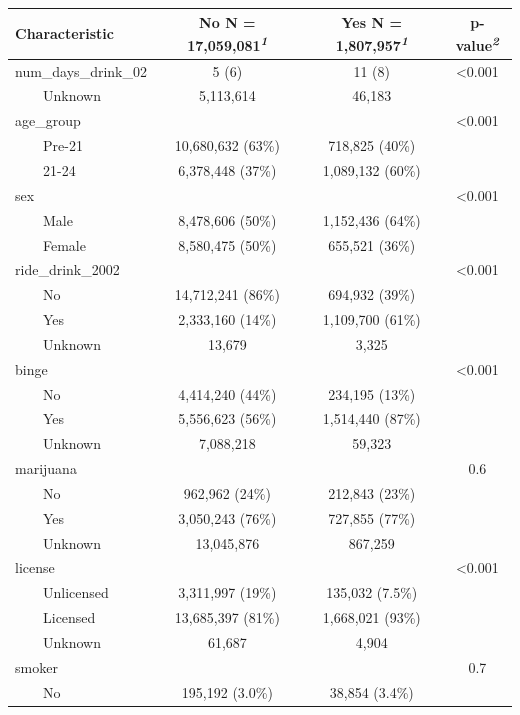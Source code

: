 \documentclass[
]{article}
\begin{document}
\begin{table}[t]
\fontsize{12.0pt}{14.0pt}\selectfont
\begin{tabular*}{\linewidth}{@{\extracolsep{\fill}}lccc}
\toprule
\textbf{Characteristic} & \textbf{No}  N = 17,059,081\textsuperscript{\textit{1}} & \textbf{Yes}  N = 1,807,957\textsuperscript{\textit{1}} & \textbf{p-value}\textsuperscript{\textit{2}} \\ 
\midrule\addlinespace[2.5pt]
num\_days\_drink\_02 & 5 (6) & 11 (8) & <0.001 \\ 
    Unknown & 5,113,614 & 46,183 &  \\ 
age\_group &  &  & <0.001 \\ 
    Pre-21 & 10,680,632 (63\%) & 718,825 (40\%) &  \\ 
    21-24 & 6,378,448 (37\%) & 1,089,132 (60\%) &  \\ 
sex &  &  & <0.001 \\ 
    Male & 8,478,606 (50\%) & 1,152,436 (64\%) &  \\ 
    Female & 8,580,475 (50\%) & 655,521 (36\%) &  \\ 
ride\_drink\_2002 &  &  & <0.001 \\ 
    No & 14,712,241 (86\%) & 694,932 (39\%) &  \\ 
    Yes & 2,333,160 (14\%) & 1,109,700 (61\%) &  \\ 
    Unknown & 13,679 & 3,325 &  \\ 
binge &  &  & <0.001 \\ 
    No & 4,414,240 (44\%) & 234,195 (13\%) &  \\ 
    Yes & 5,556,623 (56\%) & 1,514,440 (87\%) &  \\ 
    Unknown & 7,088,218 & 59,323 &  \\ 
marijuana &  &  & 0.6 \\ 
    No & 962,962 (24\%) & 212,843 (23\%) &  \\ 
    Yes & 3,050,243 (76\%) & 727,855 (77\%) &  \\ 
    Unknown & 13,045,876 & 867,259 &  \\ 
license &  &  & <0.001 \\ 
    Unlicensed & 3,311,997 (19\%) & 135,032 (7.5\%) &  \\ 
    Licensed & 13,685,397 (81\%) & 1,668,021 (93\%) &  \\ 
    Unknown & 61,687 & 4,904 &  \\ 
smoker &  &  & 0.7 \\ 
    No & 195,192 (3.0\%) & 38,854 (3.4\%) &  \\ 

\end{tabular*}
\end{table}
\end{document}
